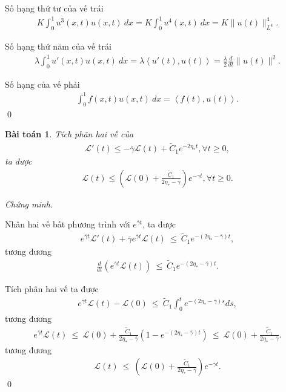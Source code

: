 \documentclass[12pt,a4paper]{article}
\newtheorem{theorem}{Bài toán}[section]
\theoremstyle{definition}
\begin{document}
Số hạng thứ tư của vế trái
\begin{align*}
    K \int_0^1 u^3(x,t) u(x,t)\:dx = K \int_0^1 u^4(x,t)\:dx = K \|u(t)\|^4_{L^4}.
\end{align*}

Số hạng thứ năm của vế trái
\begin{align*}
    \lambda \int_0^1 u'(x,t) u(x,t)\:dx = \lambda \left<u'(t), u(t)\right> = \frac{\lambda}{2} \frac{d}{dt} \|u(t)\|^2.
\end{align*}

Số hạng của vế phải
\begin{align*}
    \int_0^1 f(x,t)u(x,t)\:dx = \left<f(t), u(t)\right>.
\end{align*} \qed

\begin{theorem}
    Tích phân hai vế của
    \begin{align*}
        \mathcal{L}'(t) \le -\overline{\gamma} \mathcal{L}(t) + \tilde{C}_1 e^{-2 \eta_* t}, \forall t \ge 0,
    \end{align*}
    ta được
    \begin{align*}
        \mathcal{L}(t) \le \left(\mathcal{L}(0) + \frac{\tilde{C}_1}{2\eta_* - \overline{\gamma}}\right) e^{-\gamma t}, \forall t \ge 0.
    \end{align*}
\end{theorem}

\textit{Chứng minh.}

Nhân hai vế bất phương trình với $e^{\overline{\gamma}t}$, ta được
\begin{align*}
    e^{\overline{\gamma}t} \mathcal{L}'(t) + \overline{\gamma} e^{\overline{\gamma}t} \mathcal{L}(t) \ \le \ \tilde{C}_1 e^{-(2\eta_* - \overline{\gamma})t},
\end{align*}
tương đương
\begin{align*}
    \frac{d}{dt}\left(e^{\overline{\gamma}t} \mathcal{L}(t)\right) \ \le \ \tilde{C}_1 e^{-(2\eta_* - \overline{\gamma})t}.
\end{align*}

Tích phân hai vế ta được
\begin{align*}
    e^{\overline{\gamma}t} \mathcal{L}(t) - \mathcal{L}(0) \ \le \ \tilde{C}_1 \int_0^t e^{-(2\eta_* - \overline{\gamma})s}ds,
\end{align*}
tương đương
\begin{align*}
    e^{\overline{\gamma}t} \mathcal{L}(t) \ \le \ \mathcal{L}(0) + \frac{\tilde{C}_1}{2\eta_* - \overline{\gamma}} \left(1 - e^{-(2\eta_* - \overline{\gamma})t}\right) \ \le \ \mathcal{L}(0) + \frac{\tilde{C}_1}{2\eta_* - \overline{\gamma}}.
\end{align*}
tương đương
\begin{align*}
    \mathcal{L}(t) \ \le \ \left(\mathcal{L}(0) + \frac{\tilde{C}_1}{2\eta_* - \overline{\gamma}}\right) e^{-\overline{\gamma}t}.
\end{align*} \qed
\end{document}
